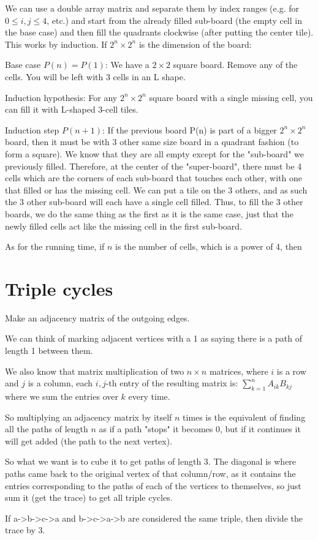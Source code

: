 \documentclass[11pt,letterpaper]{article}
\begin{document}
		We can use a double array matrix and separate them by index ranges (e.g. for $0 \leq i,j \le 4$, etc.) and start from the already filled sub-board (the empty cell in the base case) and then fill the quadrants clockwise (after putting the center tile).\newline
		\linebreak This works by induction.
		If $2^n \times 2^n$ is the dimension of the board:
		
		Base case $P(n)=P(1)$: We have a $2 \times 2$ square board. Remove any of the cells. You will be left with 3 cells in an L shape.
		
		Induction hypothesis: For any $2^n \times 2^n$ square board with a single missing cell, you can fill it with L-shaped 3-cell tiles.
		
		Induction step $P(n+1)$: If the previous board P(n) is part of a bigger $2^n \times 2^n$ board, then it must be with 3 other same size board in a quadrant fashion (to form a square). We know that they are all empty except for the "sub-board" we previously filled. Therefore, at the center of the "super-board", there must be 4 cells which are the corners of each sub-board that touches each other, with one that filled or has the missing cell. We can put a tile on the 3 others, and as such the 3 other sub-board will each have a single cell filled. Thus, to fill the 3 other boards, we do the same thing as the first as it is the same case, just that the newly filled cells act like the missing cell in the first sub-board.
		
		As for the running time, if $n$ is the number of cells, which is a power of 4, then
	
	\section{Triple cycles}
		Make an adjacency matrix of the outgoing edges.
		
		We can think of marking adjacent vertices with a 1 as saying there is a path of length 1 between them.
		
		We also know that matrix multiplication of two $n \times n$ matrices, where $i$ is a row and $j$ is a column, each $i,j$-th entry of the resulting matrix is:
		$\sum_{k=1}^{n}A_{ik}B_{kj}$
		where we sum the entries over $k$ every time.
		
		So multiplying an adjacency matrix by itself $n$ times is the equivalent of finding all the paths of length $n$ as if a path "stops" it becomes 0, but if it continues it will get added (the path to the next vertex).
		
		So what we want is to cube it to get paths of length 3.
		The diagonal is where paths came back to the original vertex of that column/row, as it contains the entries corresponding to the paths of each of the vertices to themselves, so just sum it (get the trace) to get all triple cycles.
		
		If a->b->c->a and b->c->a->b are considered the same triple, then divide the trace by 3.
	
\end{document}
